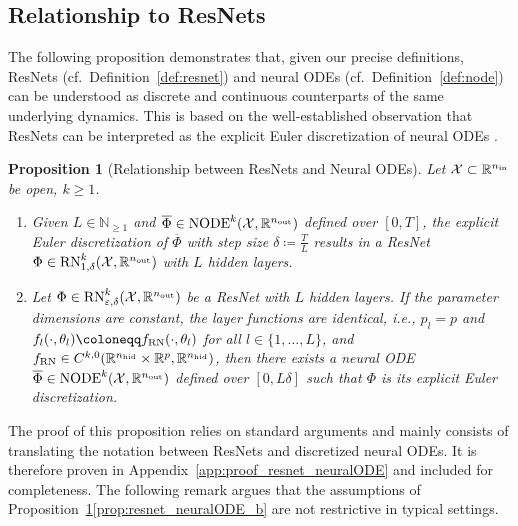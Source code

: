 \documentclass[10pt]{article}
\newtheorem{proposition}[theorem]{Proposition}
\theoremstyle{definition}
\numberwithin{equation}{section}
\newcommand{\eps}{\varepsilon}
\newcommand{\R}{\mathbb{R}}
\newcommand*{\nout}{n_\textup{out}}
\newcommand*{\nhid}{n_\textup{hid}}
\newcommand*{\nin}{n_\textup{in}}
\newcommand*{\RN}{\textup{RN}_{\eps,\delta}^k(\mathcal{X},\R^{\nout})}
\newcommand*{\NODE}{\textup{NODE}^k(\mathcal{X},\R^{\nout})}
\begin{document}
\subsection{Relationship to ResNets}
\label{sec:node_relationship}

The following proposition demonstrates that, given our precise definitions, ResNets (cf.~Definition~\ref{def:resnet}) and neural ODEs (cf.~Definition~\ref{def:node}) can be understood as discrete and continuous counterparts of the same underlying dynamics. This is based on the well-established observation that ResNets can be interpreted as the explicit Euler discretization of neural ODEs \cite{Weinan2017}.

  \begin{proposition}[Relationship between ResNets and Neural ODEs]\label{prop:resnet_neuralODE}
    Let $\mathcal{X} \subset \R^{\nin}$ be open, $k \geq 1$.
    \begin{enumerate}[label=(\alph*), font=\normalfont]
        \item \label{prop:resnet_neuralODE_a} Given $L \in \mathbb{N}_{\geq 1}$ and $\overline{\Phi} \in \NODE$ defined over $[0,T]$, the explicit Euler discretization of $\overline{\Phi}$ with step size $\delta \coloneqq \frac{T}{L}$ results in a ResNet $\Phi \in \textup{RN}^k_{1,\delta}(\mathcal{X},\R^{\nout})$ with $L$ hidden layers.
        \item  \label{prop:resnet_neuralODE_b} Let $\Phi \in \RN$ be a ResNet with $L$ hidden layers. If the parameter dimensions are constant, the layer functions are identical, i.e., $p_l = p$ and $f_l(\cdot,\theta_l) \coloneqq f_{\textup{RN}}(\cdot,\theta_l)$ for all $l\in\{1,\ldots,L\}$, and $f_\textup{RN} \in C^{k,0}(\R^{\nhid}\times\R^p,\R^{\nhid})$, then there exists a neural ODE $\overline{\Phi} \in \NODE$ defined over $[0, L\delta]$ such that $\Phi$ is its explicit Euler discretization.
    \end{enumerate}
\end{proposition}

The proof of this proposition relies on standard arguments and mainly consists of translating the notation between ResNets and discretized neural ODEs. It is therefore proven in Appendix~\ref{app:proof_resnet_neuralODE} and included for completeness. The following remark argues that the assumptions of Proposition~\ref{prop:resnet_neuralODE}\ref{prop:resnet_neuralODE_b} are not restrictive in typical settings.
\end{document}
